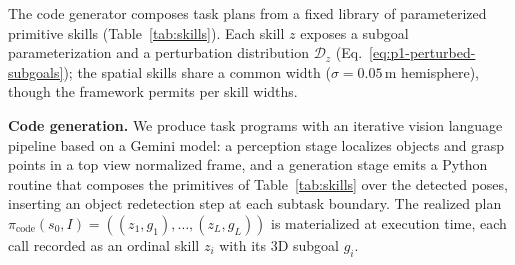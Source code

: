 \documentclass{article}
\begin{document}
The code generator composes task plans from a fixed library of parameterized
primitive skills (Table~\ref{tab:skills}). Each skill $z$ exposes a subgoal
parameterization and a perturbation distribution $\mathcal{D}_{z}$
(Eq.~\eqref{eq:p1-perturbed-subgoals}); the spatial skills share a common width
($\sigma{=}0.05$\,m hemisphere), though the framework permits per skill widths.

\textbf{Code generation.}
We produce task programs with an iterative vision language pipeline based on a
Gemini model: a perception stage localizes objects and grasp points in a top view
normalized frame, and a generation stage emits a Python routine that composes the
primitives of Table~\ref{tab:skills} over the detected poses, inserting an object
redetection step at each subtask boundary. The realized plan
$\pi_{\mathrm{code}}(s_0,I)=((z_1,g_1),\dots,(z_L,g_L))$ is materialized at
execution time, each call recorded as an ordinal skill $z_i$ with its $3$D subgoal
$g_i$.
\end{document}

